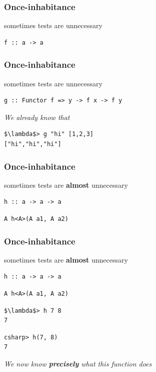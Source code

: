 \begin{frame}[fragile]
\frametitle{Once-inhabitance}
\begin{block}{sometimes tests are unnecessary}
\begin{lstlisting}[style=haskell]
f :: a -> a
\end{lstlisting}
\end{block}
\end{frame}

\begin{frame}[fragile]
\frametitle{Once-inhabitance}
\begin{block}{sometimes tests are unnecessary}
\begin{lstlisting}[style=haskell]
g :: Functor f => y -> f x -> f y
\end{lstlisting}
\end{block}
\emph{We already know that}
\begin{lstlisting}[style=haskell,mathescape]
$\lambda$> g "hi" [1,2,3]
["hi","hi","hi"]
\end{lstlisting}
\end{frame}

\begin{frame}[fragile]
\frametitle{Once-inhabitance}
\begin{block}{sometimes tests are \textbf{almost} unnecessary}
\begin{lstlisting}[style=haskell]
h :: a -> a -> a
\end{lstlisting}
\begin{lstlisting}[style=csharp]
A h<A>(A a1, A a2)
\end{lstlisting}
\end{block}
\end{frame}

\begin{frame}[fragile]
\frametitle{Once-inhabitance}
\begin{block}{sometimes tests are \textbf{almost} unnecessary}
\begin{lstlisting}[style=haskell]
h :: a -> a -> a
\end{lstlisting}
\begin{lstlisting}[style=csharp]
A h<A>(A a1, A a2)
\end{lstlisting}

\end{block}
\begin{lstlisting}[style=haskell,mathescape]
$\lambda$> h 7 8
7
\end{lstlisting}
\begin{lstlisting}[style=csharp]
csharp> h(7, 8)
7
\end{lstlisting}
\emph{We now know \textbf{precisely} what this function does}
\end{frame}

